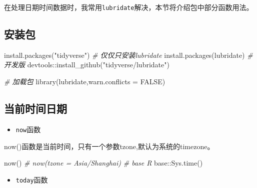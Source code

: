 \documentclass[
]{book}
\newenvironment{Shaded}{\begin{snugshade}}{\end{snugshade}}
\newcommand{\AttributeTok}[1]{\textcolor[rgb]{0.77,0.63,0.00}{#1}}
\newcommand{\CommentTok}[1]{\textcolor[rgb]{0.56,0.35,0.01}{\textit{#1}}}
\newcommand{\ConstantTok}[1]{\textcolor[rgb]{0.00,0.00,0.00}{#1}}
\newcommand{\FunctionTok}[1]{\textcolor[rgb]{0.00,0.00,0.00}{#1}}
\newcommand{\NormalTok}[1]{#1}
\newcommand{\SpecialCharTok}[1]{\textcolor[rgb]{0.00,0.00,0.00}{#1}}
\newcommand{\StringTok}[1]{\textcolor[rgb]{0.31,0.60,0.02}{#1}}
\providecommand{\tightlist}{%
  \setlength{\itemsep}{0pt}\setlength{\parskip}{0pt}}
\begin{document}
在处理日期时间数据时，我常用\texttt{lubridate}解决，本节将介绍包中部分函数用法。

\hypertarget{lubridate-install}{%
\subsection{安装包}\label{lubridate-install}}

\begin{Shaded}
\begin{Highlighting}[]
\FunctionTok{install.packages}\NormalTok{(}\StringTok{"tidyverse"}\NormalTok{)}
\CommentTok{\# 仅仅只安装lubridate}
\FunctionTok{install.packages}\NormalTok{(}\StringTok{\textquotesingle{}lubridate\textquotesingle{}}\NormalTok{)}
\CommentTok{\# 开发版}
\NormalTok{devtools}\SpecialCharTok{::}\FunctionTok{install\_github}\NormalTok{(}\StringTok{"tidyverse/lubridate"}\NormalTok{)}
\end{Highlighting}
\end{Shaded}

\begin{Shaded}
\begin{Highlighting}[]
\CommentTok{\# 加载包}
\FunctionTok{library}\NormalTok{(lubridate,}\AttributeTok{warn.conflicts =} \ConstantTok{FALSE}\NormalTok{)}
\end{Highlighting}
\end{Shaded}

\hypertarget{get-current-datetime}{%
\subsection{当前时间日期}\label{get-current-datetime}}

\begin{itemize}
\tightlist
\item
  \texttt{now}函数
\end{itemize}

now()函数是当前时间，只有一个参数tzone,默认为系统的timezone。

\begin{Shaded}
\begin{Highlighting}[]
\FunctionTok{now}\NormalTok{()}
\CommentTok{\# now(tzone = \textquotesingle{}Asia/Shanghai\textquotesingle{})}
\CommentTok{\# base R}
\NormalTok{base}\SpecialCharTok{::}\FunctionTok{Sys.time}\NormalTok{()}
\end{Highlighting}
\end{Shaded}

\begin{itemize}
\tightlist
\item
  \texttt{today}函数
\end{itemize}
\end{document}

